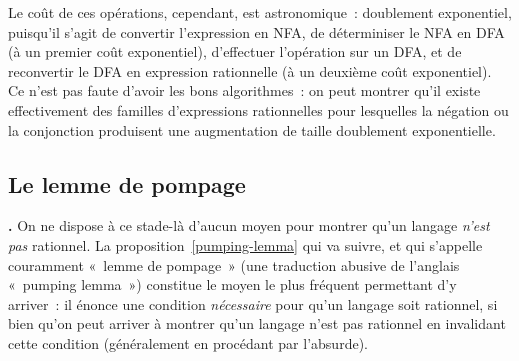 \documentclass[12pt,a4paper]{article}
\theoremstyle{definition}
\newcommand\thingy{%
\refstepcounter{comcnt}\medskip\noindent\textbf{\thecomcnt.} }
\begin{document}
\smallskip

Le coût de ces opérations, cependant, est astronomique : doublement
exponentiel, puisqu'il s'agit de convertir l'expression en NFA, de
déterminiser le NFA en DFA (à un premier coût exponentiel),
d'effectuer l'opération sur un DFA, et de reconvertir le DFA en
expression rationnelle (à un deuxième coût exponentiel).  Ce n'est pas
faute d'avoir les bons algorithmes : on peut montrer qu'il existe
effectivement des familles d'expressions rationnelles pour lesquelles
la négation ou la conjonction produisent une augmentation de taille
doublement exponentielle.



\subsection{Le lemme de pompage}\label{subsection-pumping-lemma}

\thingy On ne dispose à ce stade-là d'aucun moyen pour montrer qu'un
langage \emph{n'est pas} rationnel.  La
proposition \ref{pumping-lemma} qui va suivre, et qui s'appelle
couramment « lemme de pompage » (une traduction abusive de l'anglais
« pumping lemma ») constitue le moyen le plus fréquent permettant d'y
arriver : il énonce une condition \emph{nécessaire} pour qu'un langage
soit rationnel, si bien qu'on peut arriver à montrer qu'un langage
n'est pas rationnel en invalidant cette condition (généralement en
procédant par l'absurde).
\end{document}
